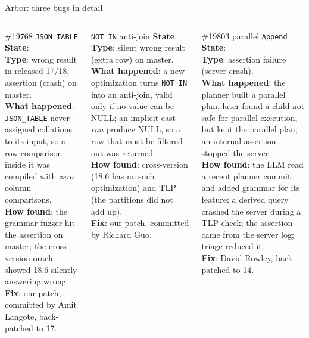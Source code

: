\documentclass[aspectratio=169,10pt]{beamer}
\begin{document}
\begin{frame}{Arbor: three bugs in detail}
\scriptsize
\begin{columns}[T]
\begin{block}{\#19768 \texttt{JSON\_TABLE}}
\textbf{State}: \\[2pt]
\textbf{Type}: wrong result in released 17/18, assertion (crash) on master.\\[2pt]
\textbf{What happened}: \texttt{JSON\_TABLE} never assigned collations to its input, so a row comparison inside it was compiled with \emph{zero} column comparisons.\\[2pt]
\textbf{How found}: the grammar fuzzer hit the assertion on master; the cross-version oracle showed 18.6 silently answering wrong.\\[2pt]
\textbf{Fix}: our patch, committed by Amit Langote, back-patched to 17.
\end{block}
\begin{block}{\texttt{NOT IN} anti-join}
\textbf{State}: \\[2pt]
\textbf{Type}: silent wrong result (extra row) on master.\\[2pt]
\textbf{What happened}: a new optimization turns \texttt{NOT IN} into an anti-join, valid only if no value can be NULL; an implicit cast \emph{can} produce NULL, so a row that must be filtered out was returned.\\[2pt]
\textbf{How found}: cross-version (18.6 has no such optimization) and TLP (the partitions did not add up).\\[2pt]
\textbf{Fix}: our patch, committed by Richard Guo.
\end{block}
\begin{block}{\#19803 parallel \texttt{Append}}
\textbf{State}: \\[2pt]
\textbf{Type}: assertion failure (server crash).\\[2pt]
\textbf{What happened}: the planner built a parallel plan, later found a child not safe for parallel execution, but kept the parallel plan; an internal assertion stopped the server.\\[2pt]
\textbf{How found}: the LLM read a recent planner commit and added grammar for its feature; a derived query crashed the server during a TLP check; the assertion came from the server log; triage reduced it.\\[2pt]
\textbf{Fix}: David Rowley, back-patched to 14.
\end{block}
\end{columns}
\end{frame}
\end{document}

